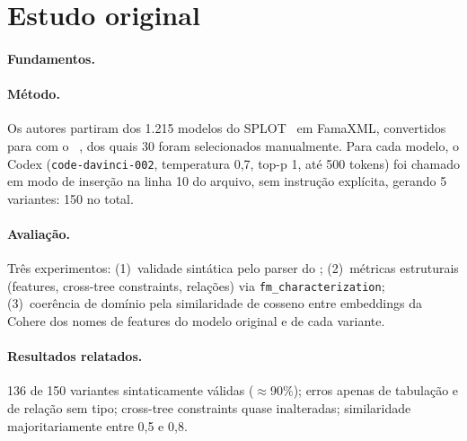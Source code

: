 \section{Estudo original}
\label{sec:original}

\paragraph{Fundamentos.} 

\paragraph{Método.} Os autores partiram dos 1.215 modelos do SPLOT~\cite{mendonca2009splot} em FamaXML, convertidos para \uvl{} com o \flamapy{}~\cite{galindo2023flamapy}, dos quais 30 foram selecionados manualmente. Para cada modelo, o Codex (\texttt{code-davinci-002}, temperatura 0,7, top-p 1, até 500 tokens) foi chamado em modo de inserção na linha 10 do arquivo, sem instrução explícita, gerando 5 variantes: 150 no total.

\paragraph{Avaliação.} Três experimentos: (1)~validade sintática pelo parser \uvl{} do \flamapy{}; (2)~métricas estruturais (features, cross-tree constraints, relações) via \texttt{fm\_characterization}; (3)~coerência de domínio pela similaridade de cosseno entre embeddings da Cohere dos nomes de features do modelo original e de cada variante.

\paragraph{Resultados relatados.} 136 de 150 variantes sintaticamente válidas ($\approx$90\%); erros apenas de tabulação e de relação sem tipo; cross-tree constraints quase inalteradas; similaridade majoritariamente entre 0,5 e 0,8. 
